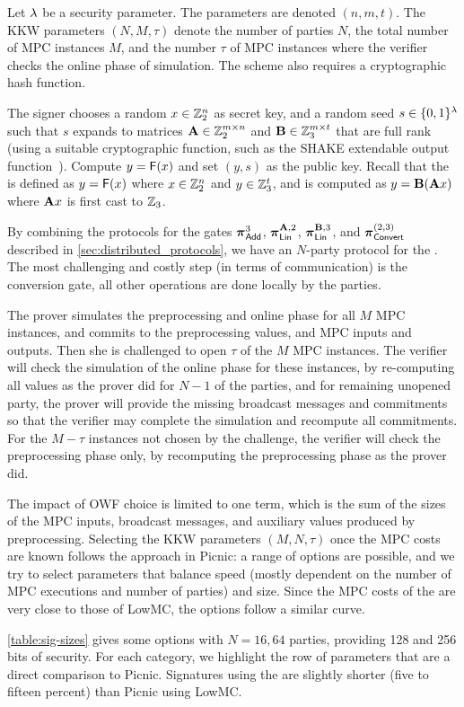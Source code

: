  Let $\lambda$ be a security parameter.  The
\ttOWF parameters are denoted $(n, m, t)$.  The KKW parameters $(N, M,
\tau)$ denote the number of parties $N$, the total number of MPC instances $M$,
and the number $\tau$ of MPC instances where the verifier checks the online
phase of simulation.  The scheme also requires a cryptographic hash function. 

The signer chooses a random $x \in \mathbb{Z}_2^n$ as secret key, and a random seed $s \in \{0,1\}^{\lambda}$ such that $s$ expands to matrices $\mathbf{A} \in \mathbb{Z}_2^{m\times n}$ and $\mathbf{B}\in \mathbb{Z}_3^{m\times t}$ that are full rank (using a suitable cryptographic
function, such as the SHAKE extendable output function~\cite{sp800-185}). Compute $y = \mathsf{F}(x)$ and set $(y, s)$ as the public key. Recall that the \ttOWF is defined as $y = \mathsf{F}(x)$ where $x \in \mathbb{Z}_2^{n}$ and $y\in \mathbb{Z}_3^{t}$, and is computed as $y = \mat{B}(\mat{A}x)$ where $\mat{A}x$ is first cast to $\mathbb{Z}_3$. 

By combining the protocols for the gates $\boldsymbol{\pi}_{\textnormal{\textsf{Add}}}^{3}$, $\prot_{\LMap}^{\mat{A},2}$, $\prot_{\LMap}^{\mat{B},3}$, and $\boldsymbol{\pi}_{\textnormal{\textsf{Convert}}}^{(2,3)}$ described in \cref{sec:distributed_protocols}, we have an $N$-party protocol for the \ttOWF. The most challenging and costly step (in terms of communication) is the conversion gate, all other operations are done locally by the parties.

The prover simulates the preprocessing and online phase for all $M$ MPC instances, and commits to the preprocessing values, and MPC inputs and outputs. Then she is challenged to open $\tau$ of the $M$ MPC instances. The verifier will check the simulation of the online phase for these instances, by re-computing all values as the prover did for $N-1$ of the parties, and for remaining unopened party, the prover will provide the missing broadcast messages and commitments so that the verifier may complete the simulation and recompute all commitments.  For the $M-\tau$ instances not chosen by the challenge, the verifier will check the preprocessing phase only, by recomputing the preprocessing phase as the prover did. 

The impact of OWF choice is limited to one term, which is the sum of the sizes of the MPC inputs, broadcast messages, and auxiliary values produced by preprocessing. Selecting the KKW parameters $(M, N, \tau)$ once the MPC costs are known follows the approach in Picnic: a range of options are possible, and we try to select parameters that balance speed (mostly dependent on the number of MPC executions and number of parties) and size. Since the MPC costs of the \ttOWF are very close to those of LowMC, the options follow a similar curve. 

\cref{table:sig-sizes} gives some options with $N=16, 64$ parties, providing 128 and 256 bits of security. For each category, we highlight the row of \ttOWF parameters that are a direct comparison to Picnic.  Signatures using the \ttOWF are slightly shorter (five to fifteen percent) than Picnic using LowMC. 
